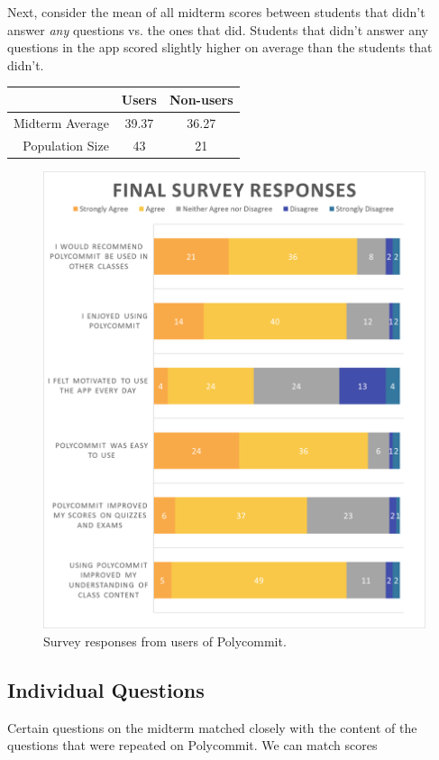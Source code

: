  \par Next, consider the mean of all midterm scores between students that didn't answer \textit{any} questions vs. the ones that did. Students that didn't answer any questions in the app scored slightly higher on average than the students that didn't.
  
 \begin{tabular}{ r c c }
  & Users & Non-users \\
  \hline			
 Midterm Average & 39.37 & 36.27 \\
 Population Size & 43 & 21
\end{tabular}

 \begin{figure}
	\includegraphics[width=1.0\linewidth]{figures/likert}
	\caption{Survey responses from users of Polycommit.}
	\label{fig:likert}
\end{figure}


\subsection{Individual Questions}
Certain questions on the midterm matched closely with the content of the questions that were repeated on Polycommit. We can match scores 


 